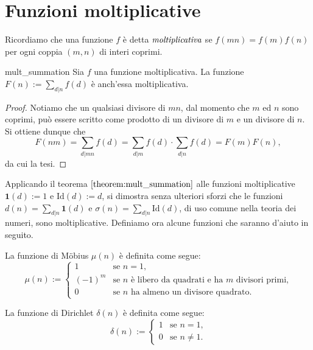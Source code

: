 \documentclass{article}
\begin{document}
\pagestyle{fancy}
\fancyhf{}
\fancyhead[R]{\nouppercase{\leftmark}}

\section{Funzioni moltiplicative}

Ricordiamo che una funzione $f$ è detta $\emph{moltiplicativa}$
se $f(mn)=f(m)f(n)$ per ogni coppia $(m,n)$ di interi coprimi.

\begin{theorem}{}{mult_summation}
	Sia $f$ una funzione moltiplicativa. La funzione		
	$F(n):=\sum_{d \vert n}f(d)$ è anch'essa moltiplicativa.
\end{theorem}
\begin{proof}
	Notiamo che un qualsiasi divisore di $mn$, dal momento che
	$m$ ed $n$ sono coprimi,
	può essere scritto come prodotto di un divisore di $m$ e un divisore di $n$.
	Si ottiene dunque che
	\begin{equation*}
		F(nm)=\sum_{d\vert mn}f(d)=\sum_{d\vert m}f(d)\cdot \sum_{d\vert n}f(d)
		=F(m)F(n),
	\end{equation*}
	da cui la tesi.
\end{proof}

Applicando il teorema $\ref{theorem:mult_summation}$ alle funzioni moltiplicative
$\textbf{1}(d):=1$ e $\text{Id}(d):=d$, si dimostra senza ulteriori sforzi che
le funzioni $d(n)=\sum_{d\vert n}\textbf{1}(d)$
e $\sigma(n)=\sum_{d\vert n}\text{Id}(d)$, di uso comune nella teoria dei numeri,
sono moltiplicative.
Definiamo ora alcune funzioni che saranno d'aiuto in seguito.

\begin{definition}
La funzione di Möbius $\mu(n)$ è definita come segue:
\begin{equation*}
	\mu(n):=
	\begin{cases}
		1 & \text{se $n=1$,} \\
		(-1)^m & \text{se $n$ è libero da quadrati e ha $m$ divisori primi,} \\
		0 & \text{se $n$ ha almeno un divisore quadrato.}
	\end{cases}
\end{equation*}
\end{definition}

\begin{definition}
La funzione di Dirichlet $\delta(n)$ è definita come segue:
\begin{equation*}
	\delta(n):=
	\begin{cases}
		1 & \text{se $n=1$,} \\
		0 & \text{se $n\ne 1$.}
	\end{cases}
\end{equation*}
\end{definition}
\end{document}

